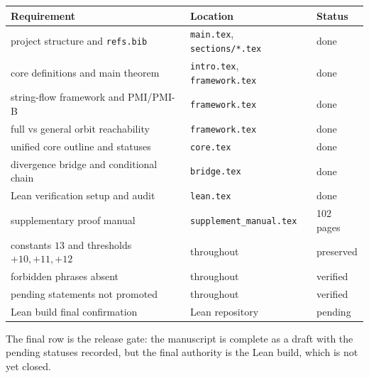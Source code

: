 \begin{center}
\small
\begin{tabular}{@{}p{}p{}p{}@{}}
\toprule
Requirement & Location & Status \\
\midrule
project structure and \texttt{refs.bib} & \texttt{main.tex},
  \texttt{sections/*.tex} & done \\
core definitions and main theorem & \texttt{intro.tex},
  \texttt{framework.tex} & done \\
string-flow framework and PMI/PMI-B & \texttt{framework.tex} & done \\
full vs general orbit reachability & \texttt{framework.tex} & done \\
unified core outline and statuses & \texttt{core.tex} & done \\
divergence bridge and conditional chain & \texttt{bridge.tex} & done \\
Lean verification setup and audit & \texttt{lean.tex} & done \\
supplementary proof manual & \texttt{supplement\_manual.tex} &
  102 pages \\
constants $13$ and thresholds $+10,+11,+12$ & throughout & preserved \\
forbidden phrases absent & throughout & verified \\
pending statements not promoted & throughout & verified \\
Lean build final confirmation & Lean repository & pending \\
\bottomrule
\end{tabular}
\end{center}

The final row is the release gate: the manuscript is complete as a
draft with the pending statuses recorded, but the final authority is
the Lean build, which is not yet closed.
